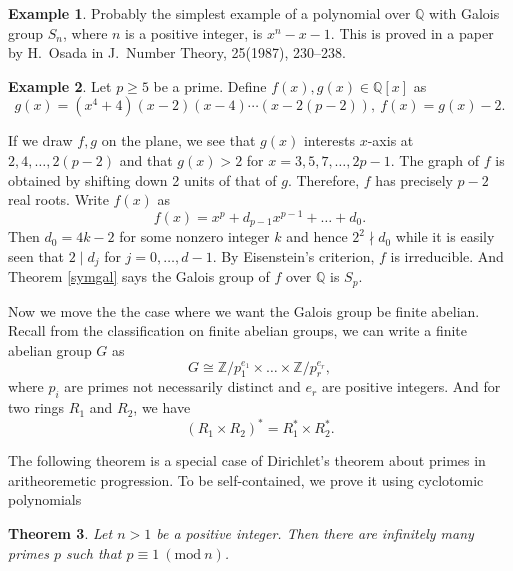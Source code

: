 \documentclass[12pt]{report}
\newtheorem{theorem}{Theorem}[section]
\theoremstyle{definition}
\newtheorem{example}[theorem]{Example}
\newcommand{\Mod}[1]{\ (\mathrm{mod}\ #1)}
\newcommand{\zz}{\mathbb{Z}}
\newcommand{\qq}{\mathbb{Q}}
\begin{document}
\begin{example}
	Probably the simplest example of a polynomial over $\qq$ with Galois group $S_n$, where $n$ is a positive integer, is $x^n-x-1$. This is proved in a paper by H.~Osada in J.~Number Theory, 25(1987), 230–238.
\end{example}

\begin{example}
	Let $p\geq 5$ be a prime. Define $f(x),g(x)\in \qq[x]$ as
	\[g(x)=(x^4+4)(x-2)(x-4)\cdots(x-2(p-2)),~f(x)=g(x)-2.\]

	If we draw $f,g$ on the plane, we see that $g(x)$ interests $x$-axis at $2,4,\dots,2(p-2)$ and that $g(x)>2$ for $x=3,5,7,\dots,2p-1$. The graph of $f$ is obtained by shifting down 2 units of that of $g$. Therefore, $f$ has precisely $p-2$ real roots. Write $f(x)$ as
	\[f(x)=x^p+d_{p-1}x^{p-1}+\dots+d_{0}.\]
	Then $d_{0}= 4k-2$ for some nonzero integer $k$ and hence $2^2\nmid d_{0}$ while it is easily seen that $2\mid d_{j}$ for $j=0,\dots,d-1$. By Eisenstein's criterion, $f$ is irreducible. And Theorem \ref{symgal} says the Galois group of $f$ over $\qq$ is $S_p$.
\end{example}


Now we move the the case where we want the Galois group be finite abelian. Recall from the classification on finite abelian groups, we can write a finite abelian group $G$ as \[G\cong \zz/p_1^{e_1}\times\dots\times \zz/p_r^{e_r},\] where $p_i$ are primes not necessarily distinct and $e_r$ are positive integers. And for two rings $R_1$ and $R_2$, we have \[(R_1\times R_2)^*=R_1^*\times R_2^*.\]

The following theorem is a special case of Dirichlet's theorem about primes in aritheoremetic progression. To be self-contained, we prove it using cyclotomic polynomials

\begin{theorem}
	Let $n>1$ be a positive integer. Then there are infinitely many primes $p$ such that $p\equiv 1\Mod{n}$.
\end{theorem}
\end{document}
